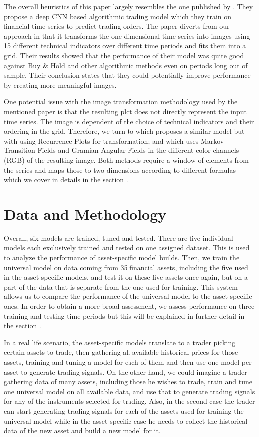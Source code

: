 \documentclass[12pt, a4paper]{article}
\begin{document}
The overall heuristics of this paper largely resembles the one published by \cite{sezer2018algorithmic}. They propose a deep CNN based algorithmic trading model which they train on financial time series to predict trading orders. The paper diverts from our approach in that it transforms the one dimensional time series into images using 15 different technical indicators over different time periods and fits them into a grid. Their results showed that the performance of their model was quite good against Buy \& Hold and other algorithmic methods even on periods long out of sample. Their conclusion states that they could potentially improve performance by creating more meaningful images. 

One potential issue with the image transformation methodology used by the mentioned paper is that the resulting plot does not directly represent the input time series. The image is dependent of the choice of technical indicators and their ordering in the grid. Therefore, we turn to \cite{hatami2018classification} which proposes a similar model but with using Recurrence Plots for transformation; and \cite{wang2015encoding} which uses Markov Transition Fields and Gramian Angular Fields in the different color channels (RGB) of the resulting image. Both methods require a window of elements from the series and maps those to two dimensions according to different formulas which we cover in details in the section .

\section{Data and Methodology}
Overall, six models are trained, tuned and tested. There are five individual models each exclusively trained and tested on one assigned dataset. This is used to analyze the performance of asset-specific model builds. 
Then, we train the universal model on data coming from 35 financial assets, including the five used in the asset-specific models, and test it on these five assets once again, but on a part of the data that is separate from the one used for training. This system allows us to compare the performance of the universal model to the asset-specific ones. In order to obtain a more broad assessment, we assess performance on three training and testing time periods but this will be explained in further detail in the section .

In a real life scenario, the asset-specific models translate to a trader picking certain assets to trade, then gathering all available historical prices for those assets, training and tuning a model for each of them and then use one model per asset to generate trading signals. 
On the other hand, we could imagine a trader gathering data of many assets, including those he wishes to trade, train and tune one universal model on all available data, and use that to generate trading signals for any of the instruments selected for trading. Also, in the second case the trader can start generating trading signals for each of the assets used for training the universal model while in the asset-specific case he needs to collect the historical data of the new asset and build a new model for it.
\end{document}
